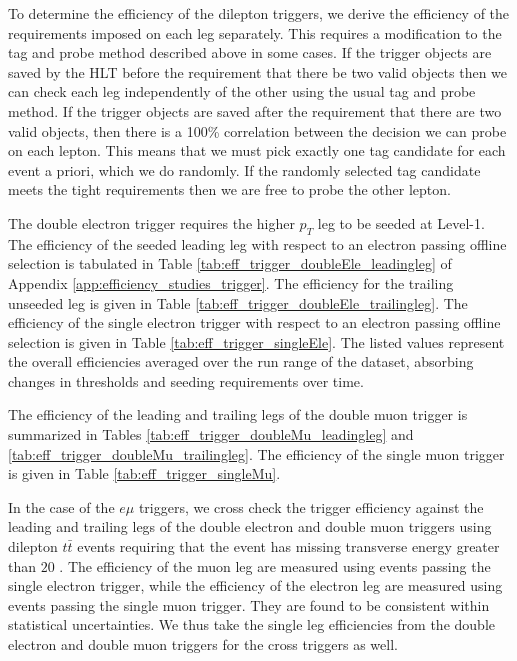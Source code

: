  
To determine the efficiency of the dilepton triggers, 
we derive the efficiency of the requirements imposed on each leg separately.
This requires a modification to the tag and probe method described above in some cases.
If the trigger objects are saved by the HLT before the requirement that there be two valid objects then
we can check each leg independently of the other using the usual tag and probe method.
If the trigger objects are saved after the requirement that there are two valid objects, then there is 
a 100\% correlation between the decision we can probe on each lepton.
This means that we must pick exactly one tag candidate for each event a priori, which we do 
randomly. 
If the randomly selected tag candidate meets the tight requirements then we are free to 
probe the other lepton.

The double electron trigger requires the higher $p_T$ leg to be seeded at Level-1.
The efficiency of the seeded leading leg with respect to an electron passing
offline selection is tabulated in 
Table \ref{tab:eff_trigger_doubleEle_leadingleg} of Appendix 
\ref{app:efficiency_studies_trigger}. The efficiency for the trailing 
unseeded leg is given in Table \ref{tab:eff_trigger_doubleEle_trailingleg}. 
The efficiency of the single electron trigger with respect to
an electron passing offline selection is given in Table \ref{tab:eff_trigger_singleEle}.
The listed values represent the overall efficiencies averaged over the run range
of the dataset, absorbing changes in thresholds and seeding requirements
over time.

The efficiency of the leading and trailing legs of the double muon trigger
is summarized in Tables \ref{tab:eff_trigger_doubleMu_leadingleg} and
\ref{tab:eff_trigger_doubleMu_trailingleg}. The efficiency of the single
muon trigger is given in Table \ref{tab:eff_trigger_singleMu}.


In the case of the $e\mu$ triggers, we cross check the trigger efficiency 
against the leading and trailing legs of the double electron and
double muon triggers using  
dilepton $t\bar{t}$ events requiring that the event has missing transverse
energy greater than $20$ \GeV. The efficiency of 
the muon leg are measured using events passing the single electron trigger,
while the efficiency of the electron leg are measured using events passing the
single muon trigger. They are found to be consistent within statistical 
uncertainties. We thus take the single leg efficiencies from the double
electron and double muon triggers for the cross triggers as well.

